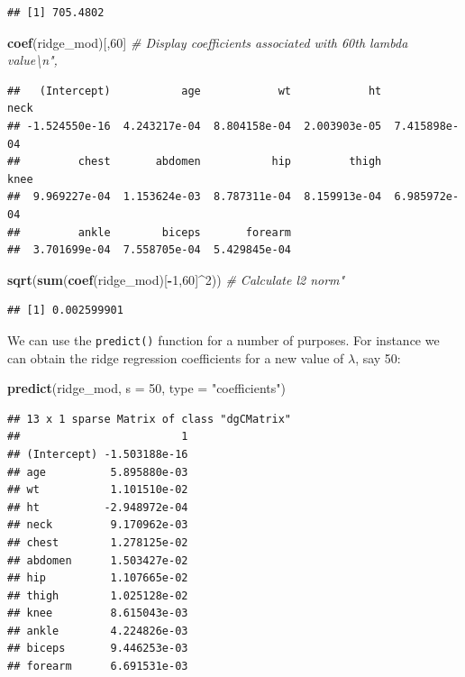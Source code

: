 \documentclass[]{article}
\newenvironment{Shaded}{\begin{snugshade}}{\end{snugshade}}
\newcommand{\KeywordTok}[1]{\textcolor[rgb]{0.13,0.29,0.53}{\textbf{#1}}}
\newcommand{\DataTypeTok}[1]{\textcolor[rgb]{0.13,0.29,0.53}{#1}}
\newcommand{\DecValTok}[1]{\textcolor[rgb]{0.00,0.00,0.81}{#1}}
\newcommand{\StringTok}[1]{\textcolor[rgb]{0.31,0.60,0.02}{#1}}
\newcommand{\CommentTok}[1]{\textcolor[rgb]{0.56,0.35,0.01}{\textit{#1}}}
\newcommand{\OperatorTok}[1]{\textcolor[rgb]{0.81,0.36,0.00}{\textbf{#1}}}
\newcommand{\NormalTok}[1]{#1}
\begin{document}
\begin{verbatim}
## [1] 705.4802
\end{verbatim}

\begin{Shaded}
\begin{Highlighting}[]
\KeywordTok{coef}\NormalTok{(ridge_mod)[,}\DecValTok{60}\NormalTok{] }\CommentTok{# Display coefficients associated with 60th lambda value\textbackslash{}n",}
\end{Highlighting}
\end{Shaded}

\begin{verbatim}
##   (Intercept)           age            wt            ht          neck 
## -1.524550e-16  4.243217e-04  8.804158e-04  2.003903e-05  7.415898e-04 
##         chest       abdomen           hip         thigh          knee 
##  9.969227e-04  1.153624e-03  8.787311e-04  8.159913e-04  6.985972e-04 
##         ankle        biceps       forearm 
##  3.701699e-04  7.558705e-04  5.429845e-04
\end{verbatim}

\begin{Shaded}
\begin{Highlighting}[]
\KeywordTok{sqrt}\NormalTok{(}\KeywordTok{sum}\NormalTok{(}\KeywordTok{coef}\NormalTok{(ridge_mod)[}\OperatorTok{-}\DecValTok{1}\NormalTok{,}\DecValTok{60}\NormalTok{]}\OperatorTok{^}\DecValTok{2}\NormalTok{)) }\CommentTok{# Calculate l2 norm"}
\end{Highlighting}
\end{Shaded}

\begin{verbatim}
## [1] 0.002599901
\end{verbatim}

We can use the \texttt{predict()} function for a number of purposes. For
instance we can obtain the ridge regression coefficients for a new value
of \(\lambda\), say 50:

\begin{Shaded}
\begin{Highlighting}[]
\KeywordTok{predict}\NormalTok{(ridge_mod, }\DataTypeTok{s =} \DecValTok{50}\NormalTok{, }\DataTypeTok{type =}  \StringTok{"coefficients"}\NormalTok{)}
\end{Highlighting}
\end{Shaded}

\begin{verbatim}
## 13 x 1 sparse Matrix of class "dgCMatrix"
##                         1
## (Intercept) -1.503188e-16
## age          5.895880e-03
## wt           1.101510e-02
## ht          -2.948972e-04
## neck         9.170962e-03
## chest        1.278125e-02
## abdomen      1.503427e-02
## hip          1.107665e-02
## thigh        1.025128e-02
## knee         8.615043e-03
## ankle        4.224826e-03
## biceps       9.446253e-03
## forearm      6.691531e-03
\end{verbatim}
\end{document}
